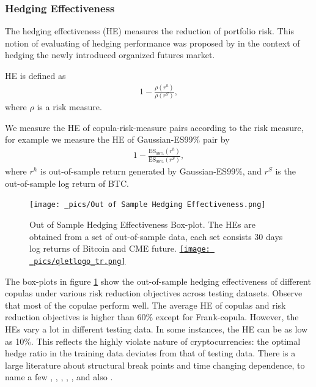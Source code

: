 \subsubsection{Hedging Effectiveness}\label{subsubsec:hedging-effectiveness}
The hedging effectiveness (HE) measures the reduction of portfolio risk.
This notion of evaluating of hedging performance was proposed by \citet{ederington1979hedging} in the context of hedging the newly introduced
organized futures market.\medskip

HE is defined as
\begin{align}
  1- \frac{\rho(r^h)}{\rho(r^S)},
  \end{align}
where $\rho$ is a risk measure.

We measure the HE of copula-risk-measure pairs according to the risk measure, for example we measure the
HE of Gaussian-ES99\% pair by
\begin{align}
  1- \frac{\text{ES}_{99\%}(r^h)}{\text{ES}_{99\%}(r^S)},
  \end{align}
where $r^h$ is out-of-sample return generated by Gaussian-ES99\%, and $r^S$ is the out-of-sample log return of BTC. \medskip

\begin{figure}[H]
   \centering
   \texttt{[image: \_pics/Out of Sample Hedging Effectiveness.png]}
   \caption{Out of Sample Hedging Effectiveness Box-plot.
   The HEs are obtained from a set of out-of-sample data,
   each set consists 30 days log returns of Bitcoin and CME future.
   \href{http://www.quantlet.com/}{\texttt{[image: \_pics/qletlogo\_tr.png]}}}
   \label{fig:OOSHE}
\end{figure}

The box-plots in figure \ref{fig:OOSHE} show the out-of-sample hedging effectiveness of different copulas under various risk
reduction objectives across testing datasets.
Observe that most of the copulae perform well.
The average HE of copulas and risk reduction objectives is higher than 60\% except for Frank-copula.
However, the HEs vary a lot in different testing data.
In some instances, the HE can be as low as 10\%.
This reflects the highly violate nature of cryptocurrencies:
the optimal hedge ratio in the training data deviates from that of testing data.
There is a large literature about structural break points and time changing dependence, to name a few
\citet{hafner2012dynamic}, \citet{patton2006modelling}, \citet{creal2008general},
\citet{engle2002dynamic}, \citet{giacomini2009inhomogeneous}, and also
\citet{manner2012survey}.\medskip

